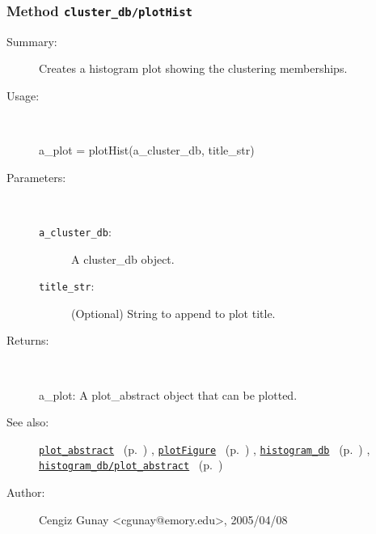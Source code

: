 \subsubsection[Method \texttt{plotHist}]{Method \texttt{cluster\_db/plotHist}}%
%
\label{ref_cluster_db__plotHist}%
\hypertarget{ref_cluster_db__plotHist}{}%
\begin{description}
\item[Summary:]Creates a histogram plot showing the clustering memberships.
%
\item[Usage:]~%
\begin{lyxcode}%
a\_plot = plotHist(a\_cluster\_db, title\_str)
%
\end{lyxcode}%
%
%
\item[Parameters:]~
\begin{description}%
\item[\texttt{a\_cluster\_db}:]
 A cluster\_db object.
\item[\texttt{title\_str}:]
 (Optional) String to append to plot title.
\end{description}%
%
\item[Returns:]~

	a\_plot: A plot\_abstract object that can be plotted.
%
%
\item[See also:]%
\hyperlink{ref_plot_abstract}{\texttt{plot\_abstract}}%
\ (p.~\pageref{ref_plot_abstract})%
%
, \hyperlink{ref_plotFigure}{\texttt{plotFigure}}%
\ (p.~\pageref{ref_plotFigure})%
%
, \hyperlink{ref_histogram_db}{\texttt{histogram\_db}}%
\ (p.~\pageref{ref_histogram_db})%
%
, \hyperlink{ref_histogram_db__plot_abstract}{\texttt{histogram\_db/plot\_abstract}}%
\ (p.~\pageref{ref_histogram_db__plot_abstract})%
%
%
\item[Author:]%
Cengiz Gunay <cgunay@emory.edu>, 2005/04/08%
\end{description}
\methodline%

